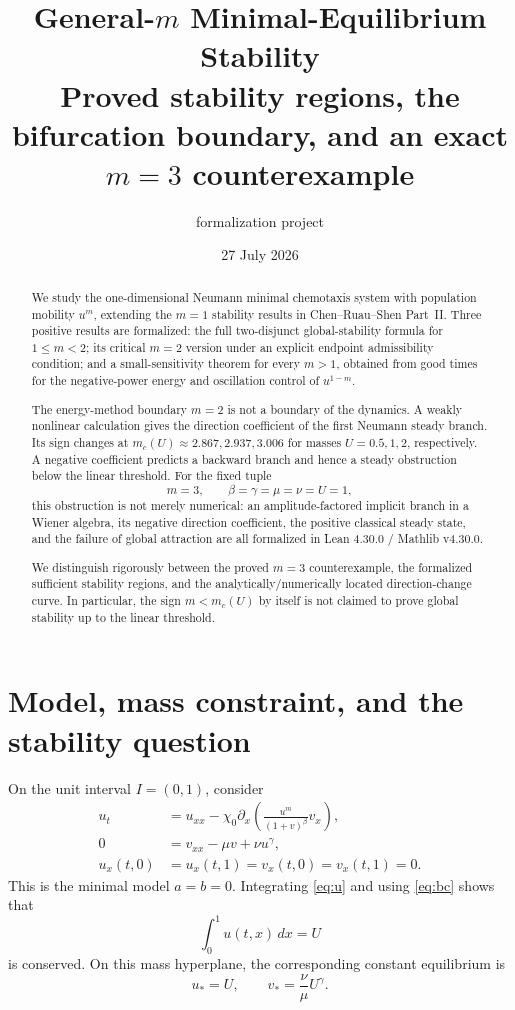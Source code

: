 \documentclass[11pt]{article}
\title{General-\(m\) Minimal-Equilibrium Stability\\
\large Proved stability regions, the bifurcation boundary, and an exact
\(m=3\) counterexample}
\author{\code{ShenWork} formalization project}
\date{27 July 2026}
\begin{document}
\maketitle

\begin{abstract}
We study the one-dimensional Neumann minimal chemotaxis system with
population mobility \(u^m\), extending the \(m=1\) stability results in
Chen--Ruau--Shen Part~II.  Three positive results are formalized: the full
two-disjunct global-stability formula for \(1\le m<2\); its critical \(m=2\)
version under an explicit endpoint admissibility condition; and a
small-sensitivity theorem for every \(m>1\), obtained from good times for the
negative-power energy and oscillation control of \(u^{1-m}\).

The energy-method boundary \(m=2\) is not a boundary of the dynamics.  A
weakly nonlinear calculation gives the direction coefficient of the first
Neumann steady branch.  Its sign changes at
\(m_c(U)\approx2.867,2.937,3.006\) for masses
\(U=0.5,1,2\), respectively.  A negative coefficient predicts a backward
branch and hence a steady obstruction below the linear threshold.  For the
fixed tuple
\[
 m=3,\qquad \beta=\gamma=\mu=\nu=U=1,
\]
this obstruction is not merely numerical: an amplitude-factored implicit
branch in a Wiener algebra, its negative direction coefficient, the positive
classical steady state, and the failure of global attraction are all
formalized in Lean 4.30.0 / Mathlib v4.30.0.

We distinguish rigorously between the proved \(m=3\) counterexample, the
formalized sufficient stability regions, and the analytically/numerically
located direction-change curve.  In particular, the sign \(m<m_c(U)\) by
itself is not claimed to prove global stability up to the linear threshold.
\end{abstract}

\tableofcontents

\section{Model, mass constraint, and the stability question}

On the unit interval \(I=(0,1)\), consider
\begin{align}
 u_t
  &=u_{xx}-\chi_0\partial_x
     \left(\frac{u^m}{(1+v)^\beta}v_x\right),
                                                         \label{eq:u}\\
 0&=v_{xx}-\mu v+\nu u^\gamma,                           \label{eq:v}\\
 u_x(t,0)&=u_x(t,1)=v_x(t,0)=v_x(t,1)=0.                 \label{eq:bc}
\end{align}
This is the minimal model \(a=b=0\).  Integrating \eqref{eq:u} and using
\eqref{eq:bc} shows that
\[
  \int_0^1u(t,x)\,dx=U
\]
is conserved.  On this mass hyperplane, the corresponding constant
equilibrium is
\begin{equation}
  u_*=U,\qquad v_*=\frac{\nu}{\mu}U^\gamma.              \label{eq:eq}
\end{equation}
\end{document}
